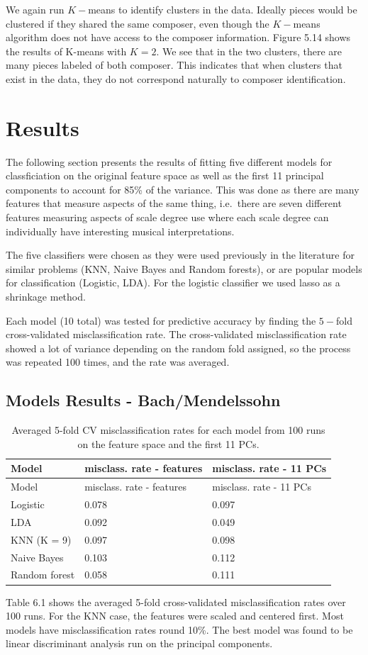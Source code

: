 \documentclass[12pt,twoside]{reedthesis}
\theoremstyle{definition}
\theoremstyle{definition}
\theoremstyle{definition}
\theoremstyle{remark}
\begin{document}
We again run \(K-\)means to identify clusters in the data. Ideally
pieces would be clustered if they shared the same composer, even though
the \(K-\)means algorithm does not have access to the composer
information. Figure 5.14 shows the results of K-means with \(K = 2\). We
see that in the two clusters, there are many pieces labeled of both
composer. This indicates that when clusters that exist in the data, they
do not correspond naturally to composer identification.

\chapter{Results}\label{results}

The following section presents the results of fitting five different
models for classficiation on the original feature space as well as the
first 11 principal components to account for 85\% of the variance. This
was done as there are many features that measure aspects of the same
thing, i.e.~there are seven different features measuring aspects of
scale degree use where each scale degree can individually have
interesting musical interpretations.

The five classifiers were chosen as they were used previously in the
literature for similar problems (KNN, Naive Bayes and Random forests),
or are popular models for classification (Logistic, LDA). For the
logistic classifier we used lasso as a shrinkage method.

Each model (10 total) was tested for predictive accuracy by finding the
\(5-\)fold cross-validated misclassification rate. The cross-validated
misclassification rate showed a lot of variance depending on the random
fold assigned, so the process was repeated 100 times, and the rate was
averaged.

\section{Models Results -
Bach/Mendelssohn}\label{models-results---bachmendelssohn}
\begin{longtable}[]{@{}lll@{}}
\caption{Averaged 5-fold CV misclassification rates for each model from
100 runs on the feature space and the first 11 PCs.}\tabularnewline
\toprule
Model & misclass. rate - features & misclass. rate - 11
PCs\tabularnewline
\midrule
\endfirsthead
\toprule
Model & misclass. rate - features & misclass. rate - 11
PCs\tabularnewline
\midrule
\endhead
Logistic & 0.078 & 0.097\tabularnewline
LDA & 0.092 & 0.049\tabularnewline
KNN (K = 9) & 0.097 & 0.098\tabularnewline
Naive Bayes & 0.103 & 0.112\tabularnewline
Random forest & 0.058 & 0.111\tabularnewline
\bottomrule
\end{longtable}
Table 6.1 shows the averaged 5-fold cross-validated misclassification
rates over 100 runs. For the KNN case, the features were scaled and
centered first. Most models have misclassification rates round 10\%. The
best model was found to be linear discriminant analysis run on the
principal components.
\end{document}
